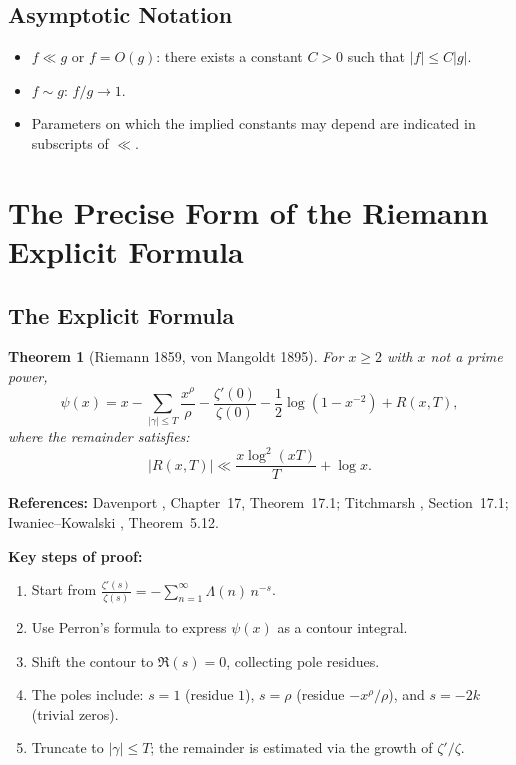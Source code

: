 \documentclass[11pt,a4paper]{article}
\newtheorem{theorem}{Theorem}[section]
\theoremstyle{remark}
\begin{document}
\subsection{Asymptotic Notation}

\begin{itemize}
\item $f \ll g$ or $f = O(g)$: there exists a constant $C > 0$ such that $|f| \leq C|g|$.
\item $f \sim g$: $f/g \to 1$.
\item Parameters on which the implied constants may depend are indicated in subscripts of $\ll$.
\end{itemize}

\section{The Precise Form of the Riemann Explicit Formula}

\subsection{The Explicit Formula}

\begin{theorem}[Riemann 1859, von Mangoldt 1895]\label{thm:explicit}
For $x \geq 2$ with $x$ not a prime power,
\begin{equation}\label{eq:explicit}
\psi(x) = x - \sum_{|\gamma| \leq T} \frac{x^\rho}{\rho} - \frac{\zeta'(0)}{\zeta(0)} - \frac{1}{2}\log(1 - x^{-2}) + R(x,T),
\end{equation}
where the remainder satisfies:
\begin{equation}\label{eq:explicit-rem}
|R(x,T)| \ll \frac{x\log^2(xT)}{T} + \log x.
\end{equation}
\end{theorem}

\noindent\textbf{References:} Davenport \cite{davenport}, Chapter~17, Theorem~17.1; Titchmarsh \cite{titchmarsh}, Section~17.1; Iwaniec--Kowalski \cite{iwaniec}, Theorem~5.12.

\noindent\textbf{Key steps of proof:}
\begin{enumerate}
\item Start from $\frac{\zeta'(s)}{\zeta(s)} = -\sum_{n=1}^\infty \Lambda(n)\, n^{-s}$.
\item Use Perron's formula to express $\psi(x)$ as a contour integral.
\item Shift the contour to $\Re(s) = 0$, collecting pole residues.
\item The poles include: $s = 1$ (residue $1$), $s = \rho$ (residue $-x^\rho/\rho$), and $s = -2k$ (trivial zeros).
\item Truncate to $|\gamma| \leq T$; the remainder is estimated via the growth of $\zeta'/\zeta$.
\end{enumerate}
\end{document}
